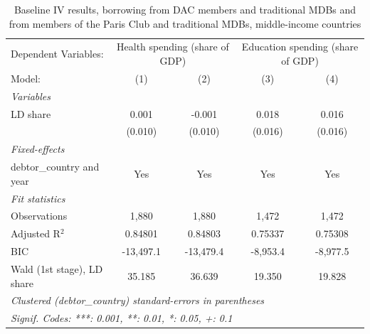 
\begin{table}[htbp]
   \caption{\label{tab:results_baseline_iv_overall_dacs+mdbs_only_other} Baseline IV results, borrowing from DAC members and traditional MDBs and from members of the Paris Club and traditional MDBs, middle-income countries}
   \centering
   \begin{tabular}{lcccc}
      \tabularnewline \midrule \midrule
      Dependent Variables: & \multicolumn{2}{c}{Health spending (share of GDP)} & \multicolumn{2}{c}{Education spending (share of GDP)}\\
      Model:                     & (1)       & (2)       & (3)      & (4)\\  
      \midrule
      \emph{Variables}\\
      LD share                   & 0.001     & -0.001    & 0.018    & 0.016\\   
                                 & (0.010)   & (0.010)   & (0.016)  & (0.016)\\   
      \midrule
      \emph{Fixed-effects}\\
      debtor\_country and year   & Yes       & Yes       & Yes      & Yes\\  
      \midrule
      \emph{Fit statistics}\\
      Observations               & 1,880     & 1,880     & 1,472    & 1,472\\  
      Adjusted R$^2$             & 0.84801   & 0.84803   & 0.75337  & 0.75308\\  
      BIC                        & -13,497.1 & -13,479.4 & -8,953.4 & -8,977.5\\  
      Wald (1st stage), LD share & 35.185    & 36.639    & 19.350   & 19.828\\  
      \midrule \midrule
      \multicolumn{5}{l}{\emph{Clustered (debtor\_country) standard-errors in parentheses}}\\
      \multicolumn{5}{l}{\emph{Signif. Codes: ***: 0.001, **: 0.01, *: 0.05, +: 0.1}}\\
   \end{tabular}
\end{table}


